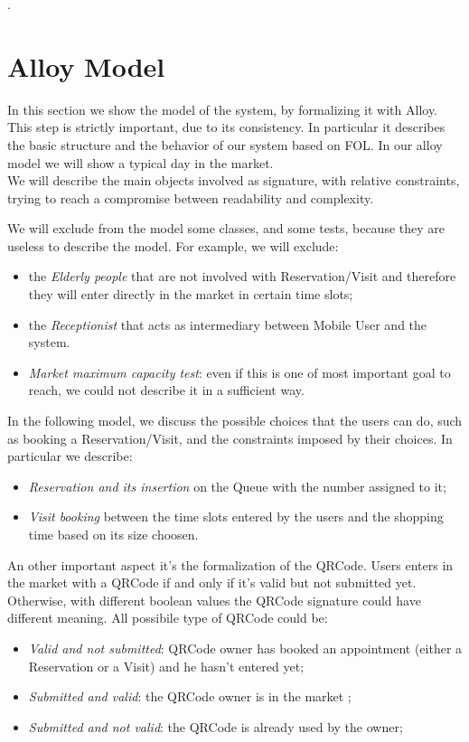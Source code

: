 \lstset{language=Alloy}.



\section{Alloy Model}
In this section we show the model of the system, by formalizing it with Alloy. This step is strictly important, due to its consistency. 
In particular it describes the basic structure and the behavior of our system based on FOL.
In our alloy model we will show a typical day in the market. \\
We will describe the main objects involved as signature, with relative constraints, trying to reach a compromise between readability and complexity.
\par
We will exclude from the model some classes, and some tests, because they are useless to describe the model.
For example, we will exclude:
\begin{itemize}
\item the \textit{Elderly people} that are not involved with Reservation/Visit and therefore they will enter directly in the market in certain time slots;
\item the \textit{Receptionist} that acts as intermediary between Mobile User and the system. 
\item \textit{Market maximum capacity test}: even if this is one of most important goal to reach, we could not describe it in a sufficient way.
\end{itemize}
\pagebreak
In the following model, we discuss the possible choices that the users can do, such as booking a Reservation/Visit, and the constraints imposed by their choices.
In particular we describe:
\begin{itemize}
\item \textit{Reservation and its insertion} on the Queue with the number assigned to it;
\item \textit{Visit booking} between the time slots entered by the users and the shopping time based on its size choosen.
\end{itemize}
\par
An other important aspect it's the formalization of the QRCode. Users enters in the market with a QRCode if and only if it's valid but not submitted yet. Otherwise, with different boolean values the QRCode signature could have different meaning. All possibile type of QRCode could be:
\begin{itemize}
    \item \textit{Valid and not submitted}: QRCode owner has booked an appointment (either a Reservation or a Visit) and he hasn't entered yet;
    \item \textit{Submitted and valid}: the QRCode owner is in the market ;
    \item \textit{Submitted and not valid}: the QRCode is already used by the owner;
\end{itemize}


